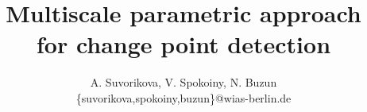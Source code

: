 \title{
Multiscale parametric approach \\ for change point detection
}


\author{A. Suvorikova, V. Spokoiny, N. Buzun \\
\{suvorikova,spokoiny,buzun\}@wias-berlin.de}





